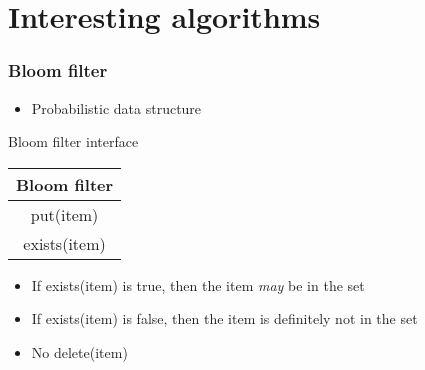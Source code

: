 \documentclass{beamer}
\begin{document}
\section{Interesting algorithms}

\begin{frame}
 \frametitle{Bloom filter}
 \begin{itemize}
  \item Probabilistic data structure
 \end{itemize}
 \begin{center}
 Bloom filter interface \\
 \vspace{0.5cm}
 \begin{tabular}{c}
  Bloom filter \\
  \hline
  put(item) \\
  exists(item) \\
 \end{tabular}
 \end{center}
 \begin{itemize}
  \item If exists(item) is true, then the item \emph{may} be in the set
  \item If exists(item) is false, then the item is definitely not in the
        set
  \item No delete(item)
 \end{itemize}
\end{frame}
\end{document}
